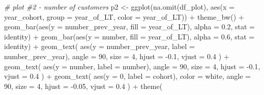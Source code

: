 \documentclass[
]{book}
\newenvironment{Shaded}{\begin{snugshade}}{\end{snugshade}}
\newcommand{\AttributeTok}[1]{\textcolor[rgb]{0.77,0.63,0.00}{#1}}
\newcommand{\CommentTok}[1]{\textcolor[rgb]{0.56,0.35,0.01}{\textit{#1}}}
\newcommand{\DecValTok}[1]{\textcolor[rgb]{0.00,0.00,0.81}{#1}}
\newcommand{\FloatTok}[1]{\textcolor[rgb]{0.00,0.00,0.81}{#1}}
\newcommand{\FunctionTok}[1]{\textcolor[rgb]{0.00,0.00,0.00}{#1}}
\newcommand{\NormalTok}[1]{#1}
\newcommand{\OtherTok}[1]{\textcolor[rgb]{0.56,0.35,0.01}{#1}}
\newcommand{\SpecialCharTok}[1]{\textcolor[rgb]{0.00,0.00,0.00}{#1}}
\newcommand{\StringTok}[1]{\textcolor[rgb]{0.31,0.60,0.02}{#1}}
\begin{document}
\begin{Shaded}
\begin{Highlighting}[]
\CommentTok{\# plot \#2 {-} number of customers}
\NormalTok{p2 }\OtherTok{\textless{}{-}}
    \FunctionTok{ggplot}\NormalTok{(}\FunctionTok{na.omit}\NormalTok{(df\_plot),}
           \FunctionTok{aes}\NormalTok{(}\AttributeTok{x =}\NormalTok{ year\_cohort, }\AttributeTok{group =}\NormalTok{ year\_of\_LT, }\AttributeTok{color =}\NormalTok{ year\_of\_LT)) }\SpecialCharTok{+}
    \FunctionTok{theme\_bw}\NormalTok{() }\SpecialCharTok{+}
    \FunctionTok{geom\_bar}\NormalTok{(}\FunctionTok{aes}\NormalTok{(}\AttributeTok{y =}\NormalTok{ number\_prev\_year, }\AttributeTok{fill =}\NormalTok{ year\_of\_LT),}
             \AttributeTok{alpha =} \FloatTok{0.2}\NormalTok{,}
             \AttributeTok{stat =} \StringTok{\textquotesingle{}identity\textquotesingle{}}\NormalTok{) }\SpecialCharTok{+}
    \FunctionTok{geom\_bar}\NormalTok{(}\FunctionTok{aes}\NormalTok{(}\AttributeTok{y =}\NormalTok{ number, }\AttributeTok{fill =}\NormalTok{ year\_of\_LT),}
             \AttributeTok{alpha =} \FloatTok{0.6}\NormalTok{,}
             \AttributeTok{stat =} \StringTok{\textquotesingle{}identity\textquotesingle{}}\NormalTok{) }\SpecialCharTok{+}
    \FunctionTok{geom\_text}\NormalTok{(}
        \FunctionTok{aes}\NormalTok{(}\AttributeTok{y =}\NormalTok{ number\_prev\_year, }\AttributeTok{label =}\NormalTok{ number\_prev\_year),}
        \AttributeTok{angle =} \DecValTok{90}\NormalTok{,}
        \AttributeTok{size =} \DecValTok{4}\NormalTok{,}
        \AttributeTok{hjust =} \SpecialCharTok{{-}}\FloatTok{0.1}\NormalTok{,}
        \AttributeTok{vjust =} \FloatTok{0.4}
\NormalTok{    ) }\SpecialCharTok{+}
    \FunctionTok{geom\_text}\NormalTok{(}
        \FunctionTok{aes}\NormalTok{(}\AttributeTok{y =}\NormalTok{ number, }\AttributeTok{label =}\NormalTok{ number),}
        \AttributeTok{angle =} \DecValTok{90}\NormalTok{,}
        \AttributeTok{size =} \DecValTok{4}\NormalTok{,}
        \AttributeTok{hjust =} \SpecialCharTok{{-}}\FloatTok{0.1}\NormalTok{,}
        \AttributeTok{vjust =} \FloatTok{0.4}
\NormalTok{    ) }\SpecialCharTok{+}
    \FunctionTok{geom\_text}\NormalTok{(}
        \FunctionTok{aes}\NormalTok{(}\AttributeTok{y =} \DecValTok{0}\NormalTok{, }\AttributeTok{label =}\NormalTok{ cohort),}
        \AttributeTok{color =} \StringTok{\textquotesingle{}white\textquotesingle{}}\NormalTok{,}
        \AttributeTok{angle =} \DecValTok{90}\NormalTok{,}
        \AttributeTok{size =} \DecValTok{4}\NormalTok{,}
        \AttributeTok{hjust =} \SpecialCharTok{{-}}\FloatTok{0.05}\NormalTok{,}
        \AttributeTok{vjust =} \FloatTok{0.4}
\NormalTok{    ) }\SpecialCharTok{+}
    \FunctionTok{theme}\NormalTok{(}

\end{Highlighting}
\end{Shaded}
\end{document}
